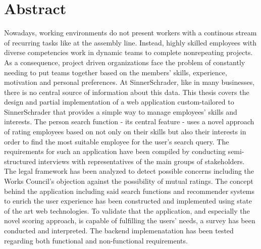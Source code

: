 \chapter{Abstract}
Nowadays, working environments do not present workers with a continous stream of recurring tasks like at the assembly line. Instead, highly skilled employees with diverse competencies work in dynamic teams to complete nonrepeating projects.
As a consequence, project driven organizations face the problem of constantly needing to put teams together based on the members’ skills, experience, motivation and personal preferences. At SinnerSchrader, like in many businesses, there is no central source of information about this data.
This thesis covers the design and partial implementation of a web application custom-tailored to SinnerSchrader that provides a simple way to manage employees' skills and interests. The person search function - its central feature - uses a novel approach of rating employees based on not only on their skills but also their interests in order to find the most suitable employee for the user's search query.
The requirements for such an application have been compiled by conducting semi-structured interviews with representatives of the main groups of stakeholders.
The legal framework has been analyzed to detect possible concerns including the Works Council's objection against the possibility of mutual ratings.
The concept behind the application including said search functions and recommender systems to enrich the user experience has been constructed and implemented using state of the art web technologies. To validate that the application, and especially the novel scoring approach, is capable of fulfilling the users’ needs, a survey has been conducted and interpreted. The backend implemenatation has been tested regarding both functional and non-functional requirements.
